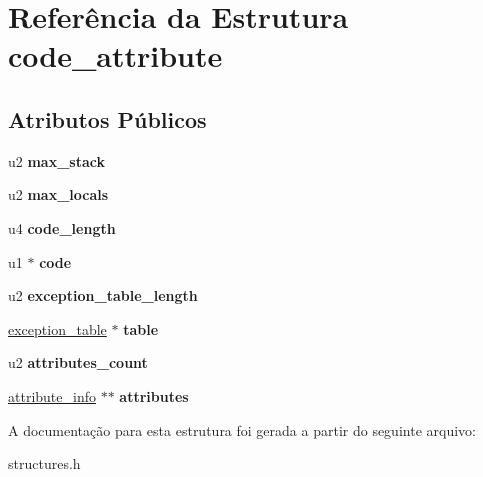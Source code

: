 \hypertarget{structcode__attribute}{}\section{Referência da Estrutura code\+\_\+attribute}
\label{structcode__attribute}
\subsection*{Atributos Públicos}
\begin{DoxyCompactItemize}
\item 
\mbox{\label{structcode__attribute_abd4d398c165a4e91f3ea559808931473}} 
u2 {\bfseries max\+\_\+stack}
\item 
\mbox{\label{structcode__attribute_ab75487f3c1d38f9fb6ad5e71ab99dea2}} 
u2 {\bfseries max\+\_\+locals}
\item 
\mbox{\label{structcode__attribute_a8c2176f2e2a92747fd2920fde5992b43}} 
u4 {\bfseries code\+\_\+length}
\item 
\mbox{\label{structcode__attribute_a72ecf2f84184325965481ecbc8d997cd}} 
u1 $\ast$ {\bfseries code}
\item 
\mbox{\label{structcode__attribute_ab84a776a1bdeb79fde3b47279d8e12e4}} 
u2 {\bfseries exception\+\_\+table\+\_\+length}
\item 
\mbox{\label{structcode__attribute_a8bdff0149755249696a5d6aa288d7a98}} 
\hyperlink{structexception__table}{exception\+\_\+table} $\ast$ {\bfseries table}
\item 
\mbox{\label{structcode__attribute_a7c0a342c05fa196324b0806f6704916b}} 
u2 {\bfseries attributes\+\_\+count}
\item 
\mbox{\label{structcode__attribute_a6e986c701d34b14f33959e35606b46ed}} 
\hyperlink{structattribute__info}{attribute\+\_\+info} $\ast$$\ast$ {\bfseries attributes}
\end{DoxyCompactItemize}


A documentação para esta estrutura foi gerada a partir do seguinte arquivo\+:\begin{DoxyCompactItemize}
\item 
structures.\+h\end{DoxyCompactItemize}
